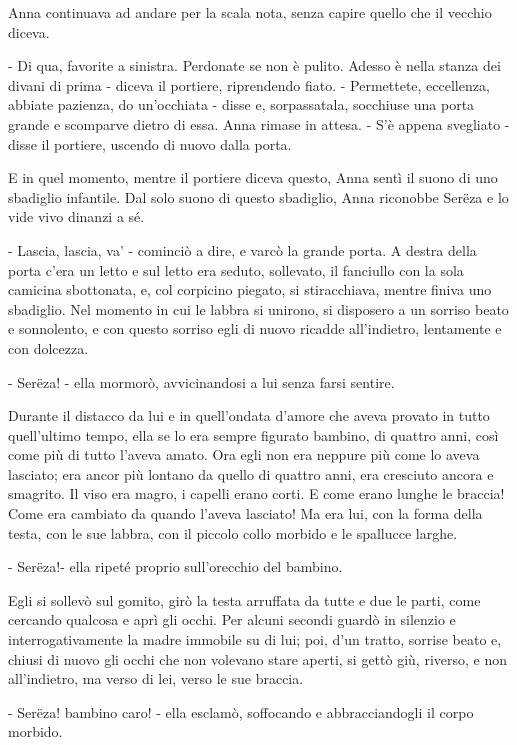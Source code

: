 Anna continuava ad andare per la scala nota, senza capire quello che il vecchio diceva. 

- Di qua, favorite a sinistra. Perdonate se non è pulito. Adesso è nella stanza dei divani di prima - diceva il portiere, riprendendo fiato. - Permettete, eccellenza, abbiate pazienza, do un'occhiata - disse e, sorpassatala, socchiuse una porta grande e scomparve dietro di essa. Anna rimase in attesa. - S'è appena svegliato - disse il portiere, uscendo di nuovo dalla porta. 

E in quel momento, mentre il portiere diceva questo, Anna sentì il suono di uno sbadiglio infantile. Dal solo suono di questo sbadiglio, Anna riconobbe Serëza e lo vide vivo dinanzi a sé. 

- Lascia, lascia, va' - cominciò a dire, e varcò la grande porta. A destra della porta c'era un letto e sul letto era seduto, sollevato, il fanciullo con la sola camicina sbottonata, e, col corpicino piegato, si stiracchiava, mentre finiva uno sbadiglio. Nel momento in cui le labbra si unirono, si disposero a un sorriso beato e sonnolento, e con questo sorriso egli di nuovo ricadde all'indietro, lentamente e con dolcezza. 

- Serëza! - ella mormorò, avvicinandosi a lui senza farsi sentire. 

Durante il distacco da lui e in quell'ondata d'amore che aveva provato in tutto quell'ultimo tempo, ella se lo era sempre figurato bambino, di quattro anni, così come più di tutto l'aveva amato. Ora egli non era neppure più come lo aveva lasciato; era ancor più lontano da quello di quattro anni, era cresciuto ancora e smagrito. Il viso era magro, i capelli erano corti. E come erano lunghe le braccia! Come era cambiato da quando l'aveva lasciato! Ma era lui, con la forma della testa, con le sue labbra, con il piccolo collo morbido e le spallucce larghe. 

- Serëza!- ella ripeté proprio sull'orecchio del bambino. 

Egli si sollevò sul gomito, girò la testa arruffata da tutte e due le parti, come cercando qualcosa e aprì gli occhi. Per alcuni secondi guardò in silenzio e interrogativamente la madre immobile su di lui; poi, d'un tratto, sorrise beato e, chiusi di nuovo gli occhi che non volevano stare aperti, si gettò giù, riverso, e non all'indietro, ma verso di lei, verso le sue braccia. 

- Serëza! bambino caro! - ella esclamò, soffocando e abbracciandogli il corpo morbido. 

